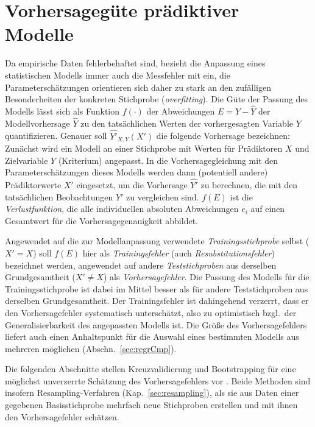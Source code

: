 \chapter{Vorhersagegüte prädiktiver Modelle}
\label{sec:prediction}

Da empirische Daten fehlerbehaftet sind, bezieht die Anpassung eines statistischen Modells immer auch die Messfehler mit ein, die Parameterschätzungen orientieren sich daher zu stark an den zufälligen Besonderheiten der konkreten Stichprobe (\emph{overfitting}). Die Güte der Passung des Modells lässt sich als Funktion $f(\cdot)$ der Abweichungen $E = Y - \hat{Y}$ der Modellvorhersage $\hat{Y}$ zu den tatsächlichen Werten der vorhergesagten Variable $Y$ quantifizieren. Genauer soll $\hat{Y'}_{X, Y}(X')$ die folgende Vorhersage bezeichnen: Zunächst wird ein Modell an einer Stichprobe mit Werten für Prädiktoren $X$ und Zielvariable $Y$ (Kriterium) angepasst. In die Vorhersagegleichung mit den Parameterschätzungen dieses Modells werden dann (potentiell andere) Prädiktorwerte $X'$ eingesetzt, um die Vorhersage $\hat{Y'}$ zu berechnen, die mit den tatsächlichen Beobachtungen $Y'$ zu vergleichen sind. $f(E)$ ist die \emph{Verlustfunktion}, die alle individuellen absoluten Abweichungen $e_{i}$ auf einen Gesamtwert für die Vorhersagegenauigkeit abbildet.

Angewendet auf die zur Modellanpassung verwendete \emph{Trainingsstichprobe} selbst ($X' = X$) soll $f(E)$ hier als \emph{Trainingsfehler} (auch \emph{Resubstitutionsfehler}) bezeichnet werden, angewendet auf andere \emph{Teststichproben} aus derselben Grundgesamtheit ($X' \neq X$) als \emph{Vorhersagefehler}. Die Passung des Modells für die Trainingsstichprobe ist dabei im Mittel besser als für andere Teststichproben aus derselben Grundgesamtheit. Der Trainingsfehler ist dahingehend verzerrt, dass er den Vorhersagefehler systematisch unterschätzt, also zu optimistisch bzgl.\ der Generalisierbarkeit des angepassten Modells ist. Die Größe des Vorhersagefehlers liefert auch einen Anhaltspunkt für die Auswahl eines bestimmten Modells aus mehreren möglichen (Abschn.\ \ref{sec:regrCmp}).

Die folgenden Abschnitte stellen Kreuzvalidierung und Bootstrapping für eine möglichst unverzerrte Schätzung des Vorhersagefehlers vor \cite{Hastie2009,James2013b,Kuhn2013}. Beide Methoden sind insofern Resampling-Verfahren (Kap.\ \ref{sec:resampling}), als sie aus Daten einer gegebenen Basisstichprobe mehrfach neue Stichproben erstellen und mit ihnen den Vorhersagefehler schätzen.

